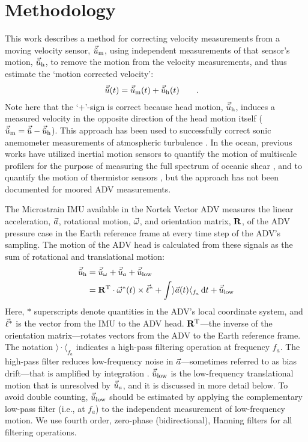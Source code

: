 
\section{Methodology}
\label{sec:methods}


\def\ue{\ensuremath{\vec{\tilde{u}}\earth}}
\def\nrot{\ensuremath{\vec{n}_{\omega}}}
\def\nacc{\ensuremath{\vec{n}_{a}}}


This work describes a method for correcting velocity measurements from a moving velocity sensor, $\umeas$, using independent measurements of that sensor's motion, $\uhead$, to remove the motion from the velocity measurements, and thus estimate the `motion corrected velocity':
\begin{align}
  \label{eqn:u_mot_def}
  \ue(t) & = \umeas(t) + \uhead(t) \qquad .
\end{align}
Note here that the `+'-sign is correct because head motion, $\uhead$, induces a measured velocity in the opposite direction of the head motion itself ($\umeas = \ue - \uhead$). This approach has been used to successfully correct sonic anemometer measurements of atmospheric turbulence \cite[e.g., ][]{Edson++1998, Miller++2008}.  In the ocean, previous works have utilized inertial motion sensors to quantify the motion of multiscale profilers for the purpose of measuring the full spectrum of oceanic shear \cite[]{Winkel++1996}, and to quantify the motion of thermistor sensors \cite[]{Moum+Nash2009b}, but the \cite{Edson++1998} approach has not been documented for moored ADV measurements.

The Microstrain IMU available in the Nortek Vector ADV measures the linear acceleration, ${\vec{a}}$, rotational motion, $\vec{\omega}$, and orientation matrix, $\mathbf{R}$, of the ADV pressure case in the Earth reference frame at every time step of the ADV's sampling. The motion of the ADV head is calculated from these signals as the sum of rotational and translational motion:
\begin{align}
  \label{eqn:uhead}
\begin{split}
  \uhead & = \urot + \uacc + \ulow \\
      & = \omatinv \cdot \AngRt^*(t)\times\l + \int \rangle \Accel(t)\langle_{f_{a}} \,\mathrm{d}t + \ulow
\end{split}
\end{align}
Here, $*$ superscripts denote quantities in the ADV's local coordinate system, and $\vec{\ell}^*$ is the vector from the IMU to the ADV head. $\mathbf{R}^\mathrm{T}$---the inverse of the orientation matrix---rotates vectors from the ADV to the Earth reference frame. The notation $\rangle \cdot \langle _{f_a}$ indicates a high-pass filtering operation at frequency $f_a$. The high-pass filter reduces low-frequency noise in ${\vec{a}}$---sometimes referred to as bias drift---that is amplified by integration \cite[]{Barshan+Whyte1995, Bevly2004, Gulmammadov2009}. $\ulow$ is the low-frequency translational motion that is unresolved by $\uacc$, and it is discussed in more detail below. To avoid double counting, $\ulow$ should be estimated by applying the complementary low-pass filter (i.e., at $f_a$) to the independent measurement of low-frequency motion. We use fourth order, zero-phase (bidirectional), Hanning filters for all filtering operations.

